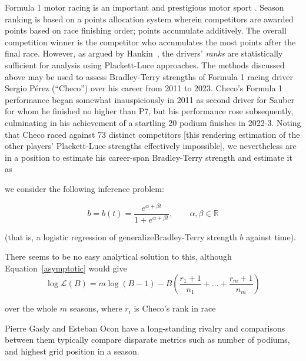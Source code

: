 \documentclass[ejs]{imsart}
\theoremstyle{plain}
\theoremstyle{definition}
\theoremstyle{remark}
\begin{document}
Formula 1 motor racing is an important and prestigious motor sport
\citep{codling2017,jenkins2010}.  Season ranking is based on a points
allocation system wherein competitors are awarded points based on race
finishing order; points accumulate additively.  The overall
competition winner is the competitor who accumulates the most points
after the final race.  However, as argued by
Hankin~\cite{hankin2023_formula1points}, the drivers' {\em ranks} are
statistically sufficient for analysis using Plackett-Luce approaches.
The methods discussed above may be used to assess Bradley-Terry
strengths of Formula 1 racing driver Sergio P\'{e}rez (``Checo'') over
his career from 2011 to 2023.  Checo's Formula 1 performance began
somewhat inauspiciously in 2011 as second driver for Sauber for whom
he finished no higher than P7, but his performance rose subsequently,
culminating in his achievement of a startling 20 podium finishes in
2022-3.  Noting that Checo raced against 73 distinct competitors [this
  rendering estimation of the other players' Plackett-Luce strengths
  effectively impossible], we nevertheless are in a position to
estimate his career-span Bradley-Terry strength and estimate it as






we consider the following inference
problem:

\begin{equation}
  b = b(t) = \frac{e^{\alpha + \beta t}}{1+e^{\alpha + \beta t}},\qquad\alpha,\beta\in\mathbb{R}
\end{equation}

(that is, a logistic regression of generalizeBradley-Terry strength
$b$ against time).


There seems to be no easy analytical solution to
this, although Equation~\ref{asymptotic} would give
\begin{equation}
  \label{asymptoticcheco}
  \log\mathcal{L}(B)=m\log(B-1) -B\left(\frac{r_1+1}{n_1}+\ldots+\frac{r_m+1}{n_m}\right)
\end{equation}

over the whole $m$ seasons, where $r_i$ is Checo's rank in race 
    







Pierre Gasly and Esteban Ocon have a long-standing rivalry and
comparisons between them typically compare disparate metrics such as
number of podiums, and highest grid position in a season.
\end{document}

